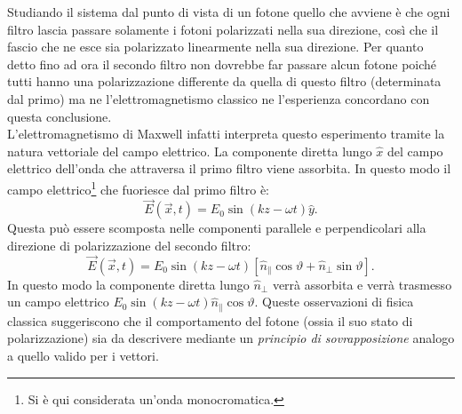 Studiando il sistema dal punto di vista di un fotone quello che avviene è che ogni filtro lascia passare solamente i fotoni polarizzati nella sua direzione, così che il fascio che ne esce sia polarizzato linearmente nella sua direzione. Per quanto detto fino ad ora il secondo filtro non dovrebbe far passare alcun fotone poiché tutti hanno una polarizzazione differente da quella di questo filtro (determinata dal primo) ma ne l'elettromagnetismo classico ne l'esperienza concordano con questa conclusione.\\ L'elettromagnetismo di Maxwell infatti interpreta questo esperimento tramite la natura vettoriale del campo elettrico. La componente diretta lungo $\hat x$ del campo elettrico dell'onda che attraversa il primo filtro viene assorbita. In questo modo il campo elettrico\footnote{Si è qui considerata un'onda monocromatica.} che fuoriesce dal primo filtro è:
\begin{equation*}
    \vec{E}(\vec x,t)= E_0 \sin(kz-\omega t)\hat y.
\end{equation*}    
Questa può essere scomposta nelle componenti parallele e perpendicolari alla direzione di polarizzazione del secondo filtro:
\begin{equation*}
    \vec{E}(\vec x,t)= E_0 \sin(kz-\omega t)[\hat n_\parallel \cos\vartheta+\hat n_\perp \sin\vartheta].
\end{equation*}
In questo modo la componente diretta lungo $\hat n_\perp$ verrà assorbita e verrà trasmesso un campo elettrico $E_0 \sin(kz-\omega t)\hat n_\parallel \cos\vartheta$. Queste osservazioni di fisica classica suggeriscono che il comportamento del fotone (ossia il suo stato di polarizzazione) sia da descrivere mediante un \emph{principio di sovrapposizione} analogo a quello valido per i vettori.\\

